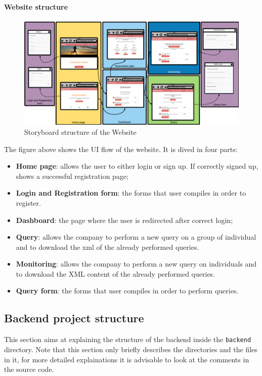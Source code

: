 \paragraph{Website structure}
\begin{figure}[H]
	\includegraphics[width=\textwidth,height=\textheight,keepaspectratio]{assets/Website_Flow.pdf}
	\caption{Storyboard structure of the Website}
	\label{fig:StoryBoard}
\end{figure}
The figure above shows the UI flow of the website.
It is dived in four parts:
\begin{itemize}
    \item \textbf{Home page}: allows the user to either login or sign up. If correctly signed up, shows a successful registration page;
    \item \textbf{Login and Registration form}: the forms that user compiles in order to register.
    \item \textbf{Dashboard}: the page where the user is redirected after correct login;
    \item \textbf{Query}: allows the company to perform a new query on a group of individual and to download the xml of the already performed queries.
    \item \textbf{Monitoring}: allows the company to perform a new query on individuals and to download the XML content of the already performed queries.
    \item \textbf{Query form}: the forms that user compiles in order to perform queries.

\end{itemize}



\subsection{Backend project structure}
This section aims at explaining the structure of the backend inside the \texttt{backend} directory.
Note that this section only briefly describes the directories and the files in it, for more detailed explainations it is advisable to look at the comments in the source code.


